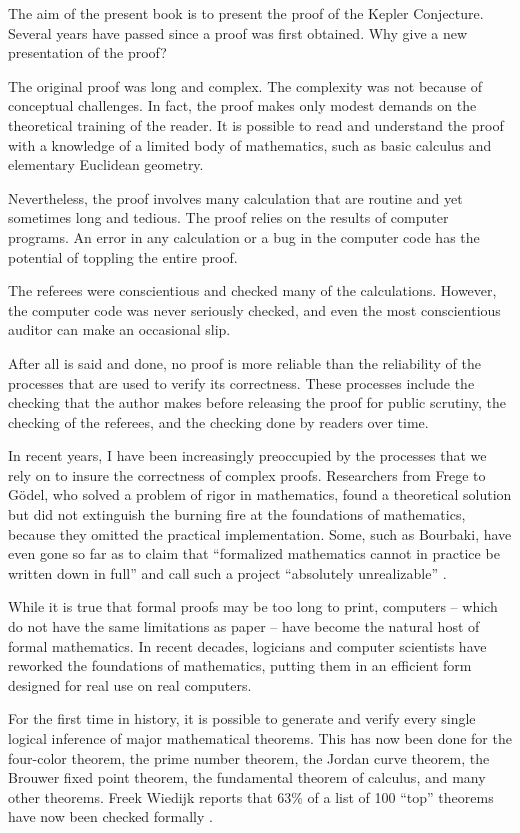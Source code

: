 

The aim of the present book is to present the proof of the Kepler
Conjecture. Several years have passed since a proof was first
obtained. Why give a new presentation of the proof?

The original proof was long and complex.  The complexity was not
because of conceptual challenges.  In fact, the proof makes only
modest demands on the theoretical training of the reader.  It is
possible to read and understand the proof with a knowledge of a
limited body of mathematics, such as basic calculus and elementary
Euclidean geometry.

Nevertheless, the proof involves many  calculation that are routine
and yet sometimes long and tedious.  The proof relies on the results
of computer programs.  An error in any calculation or a bug in the
computer code has the potential of toppling the entire proof.

The referees were conscientious and checked many of the
calculations.  However, the computer code was never seriously
checked, and even the most conscientious auditor can make an
occasional slip.

After all is said and done, no proof is more reliable than the
reliability of the processes that are used to verify its
correctness.  These processes include the checking that the author
makes before releasing the proof for public scrutiny, the checking
of the referees, and the checking done by readers over time.

In recent years, I have been increasingly preoccupied by the
processes that we rely on to insure the correctness of complex
proofs. Researchers from Frege to G\"odel, who solved a problem of
rigor in mathematics, found a theoretical solution but did not
extinguish the burning fire at the foundations of mathematics,
because they omitted the practical implementation. Some, such as
Bourbaki, have even gone so far as to claim that ``formalized
mathematics cannot in practice be written down in full'' and call
such a project
``absolutely unrealizable'' \cite[p 10,11]{Bo}. %

While it is true that formal proofs may be too long to print,
computers -- which do not have the same limitations as paper -- have
become the natural host of formal mathematics. In recent decades,
logicians and computer scientists have reworked the foundations of
mathematics, putting them in an efficient form designed for real use
on real computers.

For the first time in history, it is possible to generate and verify
every single logical inference of major mathematical theorems.  This
has now been done for the four-color theorem, the prime number
theorem, the Jordan curve theorem, the Brouwer fixed point theorem,
the fundamental theorem of calculus, and many other theorems.  Freek
Wiedijk reports that 63\% of a list of 100 ``top'' theorems have now
been checked formally \cite{freek}.

